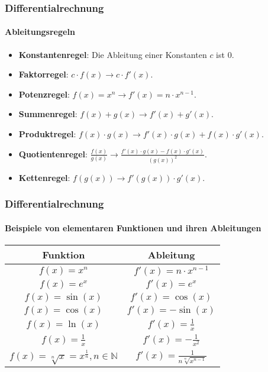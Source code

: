 \documentclass{beamer}
\begin{document}
\begin{frame}
  \frametitle{Differentialrechnung}
  \framesubtitle{Ableitungsregeln}

  \begin{itemize}
    \item \textbf{Konstantenregel}: Die Ableitung einer Konstanten $c$ ist $0$.
    \item \textbf{Faktorregel}: $c\cdot f(x) \longrightarrow c \cdot f'(x)$.
    \item \textbf{Potenzregel}: $f(x) = x^n \longrightarrow f'(x) = n \cdot x^{n-1}$.
    \item \textbf{Summenregel}: $f(x) + g(x) \longrightarrow f'(x) + g'(x)$.
    \item \textbf{Produktregel}: $f(x) \cdot g(x) \longrightarrow f'(x) \cdot g(x) + f(x) \cdot g'(x)$.
    \item \textbf{Quotientenregel}:  $\frac{f(x)}{g(x)} \longrightarrow \frac{f'(x) \cdot g(x) - f(x) \cdot g'(x)}{(g(x))^2}$.
    \item \textbf{Kettenregel}:  $f(g(x)) \longrightarrow f'(g(x)) \cdot g'(x)$.
  \end{itemize}
\end{frame}

\begin{frame}
  \frametitle{Differentialrechnung}
  \framesubtitle{Beispiele von elementaren Funktionen und ihren Ableitungen}

  \begin{center}
    \begin{tabular}{c|c}
      
      \textbf{Funktion} & \textbf{Ableitung} \\
      \hline
      $f(x) = x^n$ & $f'(x) = n \cdot x^{n-1}$ \\[.7ex]
      
      $f(x) = e^x$ & $f'(x) = e^x$ \\[.7ex]
      
      $f(x) = \sin(x)$ & $f'(x) = \cos(x)$ \\[.7ex]
  
      $f(x) = \cos(x)$ & $f'(x) = -\sin(x)$ \\[.7ex]
  
      $f(x) = \ln(x)$ & $f'(x) = \frac{1}{x}$ \\[.7ex]
  
      $f(x) = \frac{1}{x}$ & $f'(x) = -\frac{1}{x^2}$ \\[.7ex]
  
      $f(x) = \sqrt[n]{x}= x^{\frac{1}{n}}, n \in \mathbb{N}$ & $f'(x)=\frac{1}{n \sqrt[n]{x^{n-1}}}$
  
    \end{tabular}
  \end{center}

  
\end{frame}
\end{document}
